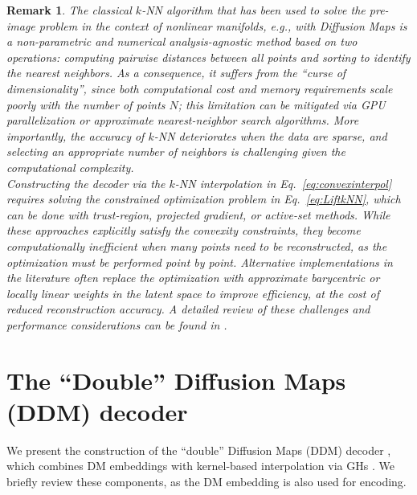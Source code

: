 \documentclass{article}
\newtheorem{remark}{Remark}
\begin{document}
\begin{remark} \label{rmk:kNN}
The classical $k$-NN algorithm that has been used to solve the pre-image problem in the context of nonlinear manifolds, e.g., with Diffusion Maps \cite{fix1985discriminatory,Patsatzis_2023} is a non-parametric and numerical analysis-agnostic method based on two operations: computing pairwise distances between all points and sorting to identify the nearest neighbors. As a consequence, it suffers from the ``curse of dimensionality'', since both computational cost and memory requirements scale poorly with the number of points $N$; this limitation can be mitigated via GPU parallelization or approximate nearest-neighbor search algorithms. More importantly, the accuracy of $k$-NN deteriorates when the data are sparse, and selecting an appropriate number of neighbors is challenging given the computational complexity. \\
Constructing the decoder via the $k$-NN interpolation in Eq.~\eqref{eq:convexinterpol} requires solving the constrained optimization problem in Eq.~\eqref{eq:LiftkNN}, which can be done with trust-region, projected gradient, or active-set methods. While these approaches explicitly satisfy the convexity constraints, they become computationally inefficient when many points need to be reconstructed, as the optimization must be performed point by point. Alternative implementations in the literature often replace the optimization with approximate barycentric or locally linear weights in the latent space to improve efficiency, at the cost of reduced reconstruction accuracy. A detailed review of these challenges and performance considerations can be found in \cite{halder2024enhancing}.

\end{remark}


\renewcommand{\theequation}{C.\arabic{equation}}
\renewcommand{\thefigure}{C.\arabic{figure}}
\renewcommand{\thetable}{C.\arabic{table}}
\renewcommand{\theprop}{C.\arabic{prop}}
\renewcommand{\theremark}{C.\arabic{remark}}
\setcounter{equation}{0}
\setcounter{figure}{0}
\setcounter{table}{0}
\setcounter{prop}{0}
\setcounter{remark}{0}
\section{The ``Double'' Diffusion Maps (DDM) decoder}
\label{app:DDM_dec}

We present the construction of the ``double'' Diffusion Maps (DDM) decoder \cite{evangelou2022double}, which combines DM embeddings \cite{coifman2005geometric,coifman2006diffusion} with kernel-based interpolation via GHs \cite{coifman2006geometric}. We briefly review these components, as the DM embedding is also used for encoding.  
\end{document}
